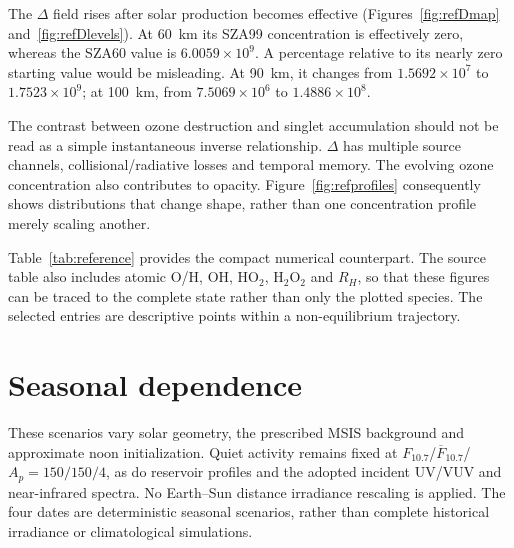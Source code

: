 
The $\Delta$ field rises after solar production becomes effective (Figures~\ref{fig:refDmap} and~\ref{fig:refDlevels}). At 60~km its SZA99 concentration is effectively zero, whereas the SZA60 value is $6.0059\times10^9$. A percentage relative to its nearly zero starting value would be misleading. At 90~km, it changes from $1.5692\times10^7$ to $1.7523\times10^9$; at 100~km, from $7.5069\times10^6$ to $1.4886\times10^8$.

The contrast between ozone destruction and singlet accumulation should not be read as a simple instantaneous inverse relationship. $\Delta$ has multiple source channels, collisional/radiative losses and temporal memory. The evolving ozone concentration also contributes to opacity. Figure~\ref{fig:refprofiles} consequently shows distributions that change shape, rather than one concentration profile merely scaling another.


Table~\ref{tab:reference} provides the compact numerical counterpart. The source table also includes atomic O/H, OH, HO$_2$, H$_2$O$_2$ and $R_H$, so that these figures can be traced to the complete state rather than only the plotted species. The selected entries are descriptive points within a non-equilibrium trajectory.

\clearpage

\section{Seasonal dependence}
These scenarios vary solar geometry, the prescribed MSIS background and approximate noon initialization. Quiet activity remains fixed at $F_{10.7}$/$\overline F_{10.7}$/$A_p=150/150/4$, as do reservoir profiles and the adopted incident UV/VUV and near-infrared spectra. No Earth--Sun distance irradiance rescaling is applied. The four dates are deterministic seasonal scenarios, rather than complete historical irradiance or climatological simulations.

